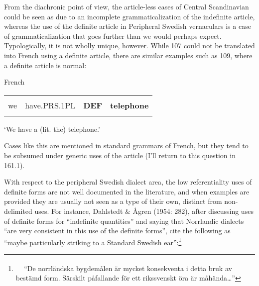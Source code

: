 \begin{styleBodytextC}
From the diachronic point of view, the article-less cases of Central Scandinavian could be seen as due to an incomplete grammaticalization of the indefinite article, whereas the use of the definite article in Peripheral Swedish vernaculars is a case of grammaticalization that goes further than we would perhaps expect. Typologically, it is not wholly unique, however. While 107 could not be translated into French using a definite article, there are similar examples such as 109, where a definite article is normal:

\end{styleBodytextC}

\begin{listWWNumileveli}
\item {}

\begin{styleExample}
\label{bkm:Ref224102943}French

\end{styleExample}

\end{listWWNumileveli}

\begin{tabular}{llll}
\lsptoprule
\multicolumn{4}{l}{Nous

}\\
we & have.PRS.1PL & {\bfseries DEF} & {\bfseries telephone}\\
\lspbottomrule
\end{tabular}

\begin{styleTranslation}
‘We have a (lit. the) telephone.’

\end{styleTranslation}

\begin{styleBodyTextFirst}
Cases like this are mentioned in standard grammars of French, but they tend to be subsumed under generic uses of the article (I’ll return to this question in 161.1). 

\end{styleBodyTextFirst}

\begin{styleBodytextC}
With respect to the peripheral Swedish dialect area, the low referentiality uses of definite forms are not well documented in the literature, and when examples are provided they are usually not seen as a type of their own, distinct from non-delimited uses. For instance, Dahlstedt \& Ågren (1954: 282), after discussing uses of definite forms for “indefinite quantities” and saying that Norrlandic dialects “are very consistent in this use of the definite forms”, cite the following as “maybe particularly striking to a Standard Swedish ear”:\footnote{\textsuperscript{\ \ } “De norrländska bygdemålen är mycket konsekventa i detta bruk av bestämd form. Särskilt påfallande för ett rikssvenskt öra är måhända…”} 

\end{styleBodytextC}

